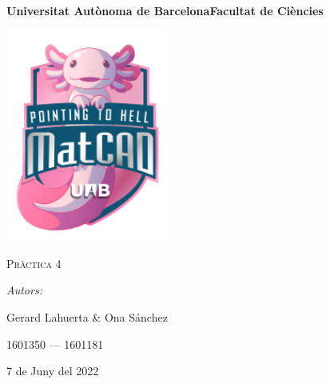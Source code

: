 \documentclass[a4paper, 11pt]{article}
\begin{document}
\begin{titlepage}
    \centering
    {\bfseries\LARGE \hspace{1.9em} Universitat Autònoma de Barcelona\newline Facultat de Ciències\par}
    \vspace{2cm}
    {\hspace{-1em}\includegraphics[width=0.4\textwidth]{logo.png}\par}
    \vspace{1cm}
    {\scshape\Huge Pràctica 4\par} 
    \vspace{1cm}
    {\Large \itshape Autors: \par}
    {\Large \hspace{-1.75em} Gerard Lahuerta \& Ona Sánchez \par}
    {\Large 1601350 --- 1601181 \par}
    \vspace{1cm}
    {\Large 7 de Juny del 2022\par}
\end{titlepage}

\justifying

\newpage
\setcounter{page}{2}
\pagestyle{plain}
\tableofcontents
\cleardoublepage
{}
\newpage
\end{document}
